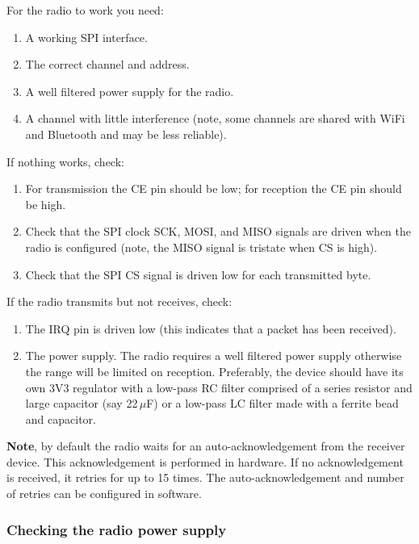 For the radio to work you need:

\begin{enumerate}
\item
  A working SPI interface.
\item
  The correct channel and address.
\item
  A well filtered power supply for the radio.
\item
  A channel with little interference (note, some channels are shared
  with WiFi and Bluetooth and may be less reliable).
\end{enumerate}

If nothing works, check:

\begin{enumerate}
\item
  For transmission the CE pin should be low; for reception the CE pin
  should be high.
\item
  Check that the SPI clock SCK, MOSI, and MISO signals are driven when
  the radio is configured (note, the MISO signal is tristate when CS is
  high).
\item
  Check that the SPI CS signal is driven low for each transmitted byte.
\end{enumerate}

If the radio transmits but not receives, check:

\begin{enumerate}
\item
  The IRQ pin is driven low (this indicates that a packet has been
  received).
\item
  The power supply. The radio requires a well filtered power supply
  otherwise the range will be limited on reception. Preferably, the
  device should have its own 3V3 regulator with a low-pass RC filter
  comprised of a series resistor and large capacitor (say 22\,$\mu$F) or a
  low-pass LC filter made with a ferrite bead and capacitor.
\end{enumerate}

\textbf{Note}, by default the radio waits for an auto-acknowledgement
from the receiver device. This acknowledgement is performed in hardware.
If no acknowledgement is received, it retries for up to 15 times. The
auto-acknowledgement and number of retries can be configured in
software.

\subsubsection{Checking the radio power supply}
\label{checking-the-radio-power-supply}

